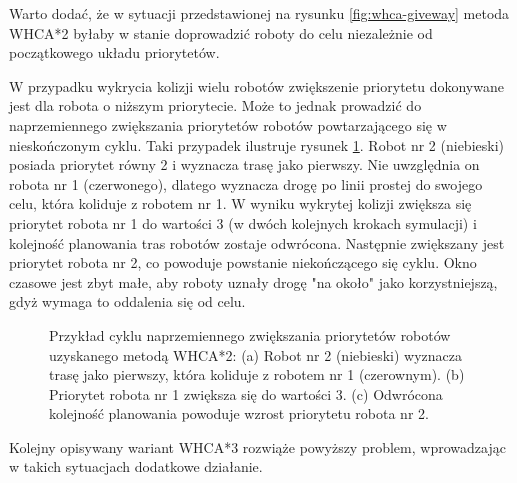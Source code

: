 Warto dodać, że w sytuacji przedstawionej na rysunku \ref{fig:whca-giveway} metoda WHCA*2 byłaby w stanie doprowadzić roboty do celu niezależnie od początkowego układu priorytetów.

W przypadku wykrycia kolizji wielu robotów zwiększenie priorytetu dokonywane jest dla robota o niższym priorytecie.
Może to jednak prowadzić do naprzemiennego zwiększania priorytetów robotów powtarzającego się w nieskończonym cyklu.
Taki przypadek ilustruje rysunek \ref{fig:whca2-head}.
Robot nr 2 (niebieski) posiada priorytet równy 2 i wyznacza trasę jako pierwszy. Nie uwzględnia on robota nr 1 (czerwonego), dlatego wyznacza drogę po linii prostej do swojego celu, która koliduje z robotem nr 1.
W wyniku wykrytej kolizji zwiększa się priorytet robota nr 1 do wartości 3 (w dwóch kolejnych krokach symulacji) i kolejność planowania tras robotów zostaje odwrócona.
Następnie zwiększany jest priorytet robota nr 2, co powoduje powstanie niekończącego się cyklu.
Okno czasowe jest zbyt małe, aby roboty uznały drogę "na około" jako korzystniejszą, gdyż wymaga to oddalenia się od celu.
\begin{figure}[H]
	\centering
		\qquad
		\qquad
	\caption{Przykład cyklu naprzemiennego zwiększania priorytetów robotów uzyskanego metodą WHCA*2:
	(a) Robot nr 2 (niebieski) wyznacza trasę jako pierwszy, która koliduje z robotem nr 1 (czerownym).
	(b) Priorytet robota nr 1 zwiększa się do wartości 3.
	(c) Odwrócona kolejność planowania powoduje wzrost priorytetu robota nr 2.}
	\label{fig:whca2-head}
\end{figure}
Kolejny opisywany wariant WHCA*3 rozwiąże powyższy problem, wprowadzając w takich sytuacjach dodatkowe działanie.

